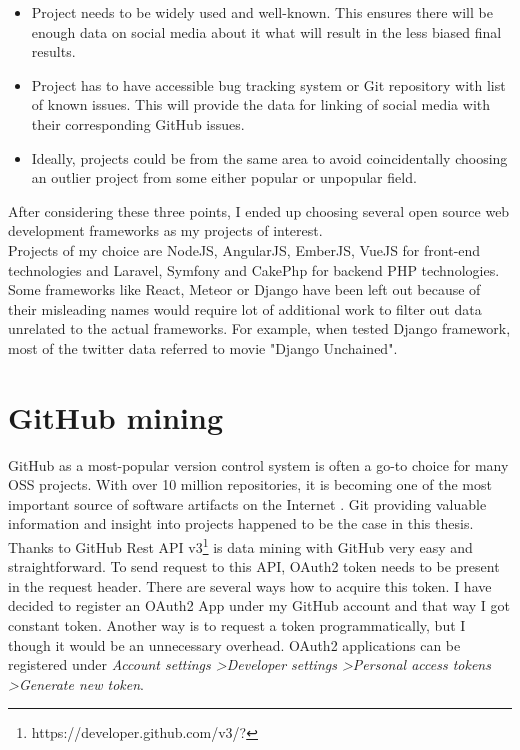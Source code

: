 \begin{itemize}
  \item Project needs to be widely used and well-known. This ensures there will be enough data on social media about it what will result in the less biased final results.
  \item Project has to have accessible bug tracking system or Git repository with list of known issues. This will provide the data for linking of social media with their corresponding GitHub issues.
  \item Ideally, projects could be from the same area to avoid coincidentally choosing an outlier project from some either popular or unpopular field.
\end{itemize}

After considering these three points, I ended up choosing several open source web development frameworks as my projects of interest. \\
Projects of my choice are NodeJS, AngularJS, EmberJS, VueJS for front-end technologies and Laravel, Symfony and CakePhp for backend PHP technologies. Some frameworks like  React, Meteor or Django have been left out because of their misleading names  would require lot of additional work to filter out data unrelated to the actual frameworks. For example, when tested Django framework, most of the twitter data referred to movie "Django Unchained".

\section{GitHub mining}
GitHub as a most-popular version control system is often a go-to choice for many OSS projects. With over 10 million repositories, it is becoming one of the most important source of software artifacts on the Internet \cite{russell2013mining}. Git providing valuable information and insight into projects happened to be the case in this thesis.\\
Thanks to GitHub Rest API v3\footnote{https://developer.github.com/v3/?} is data mining with GitHub very easy and straightforward. To send request to this API, OAuth2 token needs to be present in the request header. There are several ways how to acquire this token. I have decided to register an OAuth2 App under my GitHub account and that way I got constant token. Another way is to request a token programmatically, but I though it would be an unnecessary overhead. OAuth2 applications can be registered under \textit{Account settings \textgreater Developer settings \textgreater Personal access tokens \textgreater Generate new token}.
